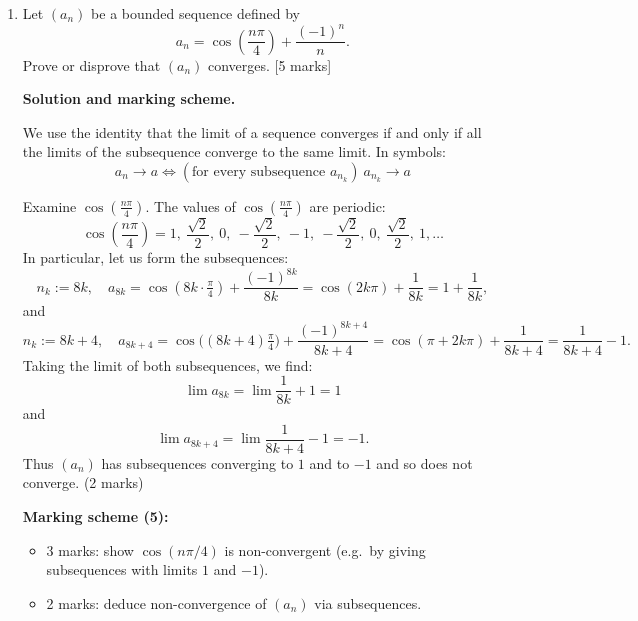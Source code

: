 \documentclass{article}
\begin{document}
\begin{enumerate}[label=(\alph*)]
    \item Let \((a_n)\) be a bounded sequence defined by  
    \[
    a_n = \cos\left(\frac{n\pi}{4}\right) + \frac{(-1)^n}{n}.
    \]
    Prove or disprove that \((a_n)\) converges. [5 marks]

    \begin{mdframed}[linecolor=black, linewidth=1pt]
    \textbf{Solution and marking scheme.}
    
    We use the identity that the limit of a sequence converges if and only if all the limits of the subsequence converge to the same limit. In symbols:
    \[
    a_n \rightarrow a \Longleftrightarrow (\text{for every subsequence } a_{n_k}) \ a_{n_k} \rightarrow a
    \]
    
    Examine $\cos\left(\frac{n\pi}{4}\right)$. The values of $\cos\left(\frac{n\pi}{4}\right)$ are periodic:
    \[
    \cos\left(\frac{n\pi}{4}\right) = 1,\ \frac{\sqrt2}{2},\ 0,\ -\frac{\sqrt2}{2},\ -1,\ -\frac{\sqrt2}{2},\ 0,\ \frac{\sqrt2}{2},\ 1,\dots
    \]
    In particular, let us form the subsequences:
    \[
    n_k := 8k, \quad a_{8k} = \cos(8k\cdot \tfrac{\pi}{4}) + \frac{(-1)^{8k}}{8k} = \cos(2k\pi) + \frac{1}{8k} = 1 + \frac{1}{8k},
    \]
    and
    \[
    n_k := 8k+4, \quad a_{8k+4} = \cos\big((8k+4)\tfrac{\pi}{4}\big) + \frac{(-1)^{8k+4}}{8k+4} = \cos(\pi+2k\pi) + \frac{1}{8k+4} = \frac{1}{8k+4} -1.
    \]
    Taking the limit of both subsequences, we find:
    \[
    \lim a_{8k} = \lim \frac{1}{8k} + 1 = 1
    \]
    and
    \[
    \lim a_{8k+4} = \lim \frac{1}{8k+4} -1 = -1.
    \]
    Thus $(a_n)$ has subsequences converging to $1$ and to $-1$ and so does not converge. (2 marks)
    
    \textbf{Marking scheme (5):}
    \begin{itemize}
      \item 3 marks: show $\cos(n\pi/4)$ is non-convergent (e.g.\ by giving subsequences with limits $1$ and $-1$).
      \item 2 marks: deduce non-convergence of $(a_n)$ via subsequences.
    \end{itemize}
    \end{mdframed}
    
\end{enumerate}

\bigskip

\end{document}
